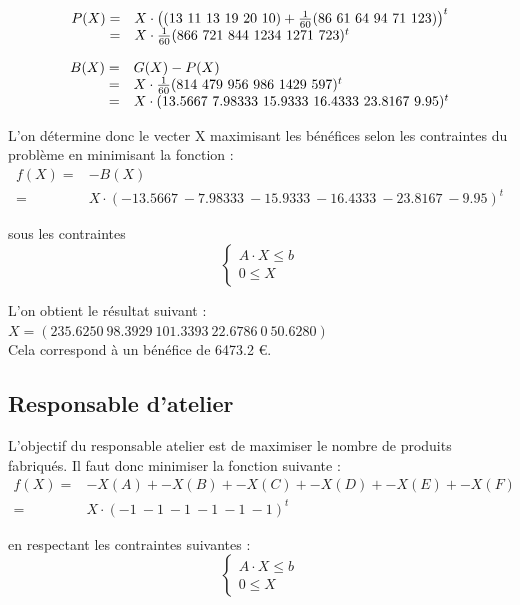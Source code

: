 \documentclass[a4paper, 11pt]{article}
\begin{document}
$$
\begin{array}{r l}
    P(X) = & X\cdot\left((13~11~13~19~20~10) + \frac{1}{60}(86~61~64~94~71~123)\right)^t \\
         = & X\cdot\frac{1}{60}(866~721~844~1234~1271~723)^t \\
\end{array}
$$

$$
\begin{array}{r l}
    B(X) = & G(X) - P(X) \\
         = & X\cdot\frac{1}{60}(814~479~956~986~1429~597)^t \\
         = & X\cdot(13.5667~7.98333~15.9333~16.4333~23.8167~9.95)^t \\
\end{array}
$$

L'on détermine donc le vecter X maximisant les bénéfices selon les contraintes du problème en minimisant la fonction :\\
$$
\begin{array}{rl}
    f(X) = & -B(X) \\
         = & X\cdot(-13.5667~-7.98333~-15.9333~-16.4333~-23.8167~-9.95)^t
\end{array}
$$

sous les contraintes
$$
\left\{
    \begin{split}
        A\cdot X \leq b\\
        0 \leq X
    \end{split}
\right.
$$

L'on obtient le résultat suivant : \\
$ X = (235.6250~98.3929~101.3393~22.6786~0~50.6280) $ \\

Cela correspond à un bénéfice de 6473.2 €.

\subsection{Responsable d'atelier}
L'objectif du responsable atelier est de maximiser le nombre de produits fabriqués.
Il faut donc minimiser la fonction suivante : \\
$$
\begin{array}{rl}
    f(X) = & -X(A) + -X(B) + -X(C) + -X(D) + -X(E) + -X(F) \\
         = & X\cdot(-1~-1~-1~-1~-1~-1)^t
\end{array}
$$

en respectant les contraintes suivantes : \\
$$
  \left\{
    \begin{split}
     A\cdot X \leq b\\ 
     0 \leq X
    \end{split}
  \right.
$$
\end{document}
